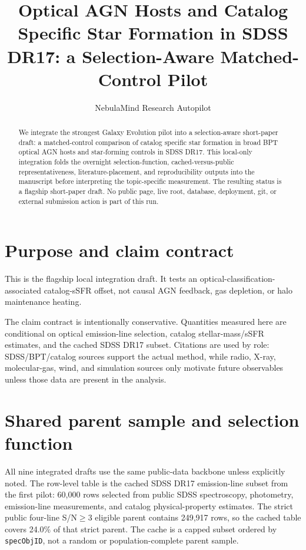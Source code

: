 \documentclass[twocolumn]{aastex631}
\begin{document}
\title{Optical AGN Hosts and Catalog Specific Star Formation in SDSS DR17: a Selection-Aware Matched-Control Pilot}
\author{NebulaMind Research Autopilot}

\begin{abstract}
We integrate the strongest Galaxy Evolution pilot into a selection-aware short-paper draft: a matched-control comparison of catalog specific star formation in broad BPT optical AGN hosts and star-forming controls in SDSS DR17. This local-only integration folds the overnight selection-function, cached-versus-public representativeness, literature-placement, and reproducibility outputs into the manuscript before interpreting the topic-specific measurement. The resulting status is a flagship short-paper draft. No public page, live root, database, deployment, git, or external submission action is part of this run.
\end{abstract}


\section{Purpose and claim contract}\label{sec:purpose}
This is the flagship local integration draft. It tests an optical-classification-associated catalog-sSFR offset, not causal AGN feedback, gas depletion, or halo maintenance heating.

The claim contract is intentionally conservative. Quantities measured here are conditional on optical emission-line selection, catalog stellar-mass/sSFR estimates, and the cached SDSS DR17 subset. Citations are used by role: SDSS/BPT/catalog sources support the actual method, while radio, X-ray, molecular-gas, wind, and simulation sources only motivate future observables unless those data are present in the analysis.


\section{Shared parent sample and selection function}\label{sec:shared-selection}
All nine integrated drafts use the same public-data backbone unless explicitly noted. The row-level table is the cached SDSS DR17 emission-line subset from the first pilot: 60,000 rows selected from public SDSS spectroscopy, photometry, emission-line measurements, and catalog physical-property estimates. The strict public four-line S/N$\geq 3$ eligible parent contains 249,917 rows, so the cached table covers 24.0\% of that strict parent. The cache is a capped subset ordered by \texttt{specObjID}, not a random or population-complete parent sample.
\end{document}
